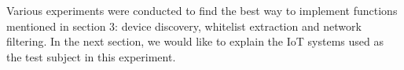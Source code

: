 Various experiments were conducted to find the best way to implement functions mentioned in section 3: device discovery, whitelist extraction and network filtering.  
In the next section, we would like to explain the IoT systems used as the test subject in this experiment.   





  